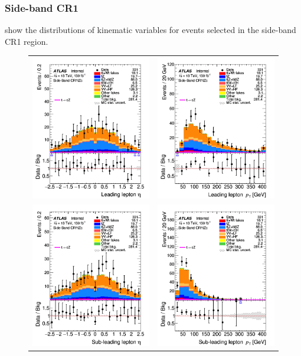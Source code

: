 \clearpage
\FloatBarrier
\subsubsection{Side-band CR1}
 show the distributions 
of kinematic variables for events selected in the side-band CR1 region. 

\begin{figure}[!htbp]
	\centering
	\begin{tabular}{cc}
		\includegraphics[width=.32\textwidth]{Chapters/CH7/figures/SBCR1/lep1_eta} &
		\includegraphics[width=.32\textwidth]{Chapters/CH7/figures/SBCR1/lep1_pt} \\
		\includegraphics[width=.32\textwidth]{Chapters/CH7/figures/SBCR1/lep2_eta} &
		\includegraphics[width=.32\textwidth]{Chapters/CH7/figures/SBCR1/lep2_pt} \\

\end{tabular}
\end{figure}
